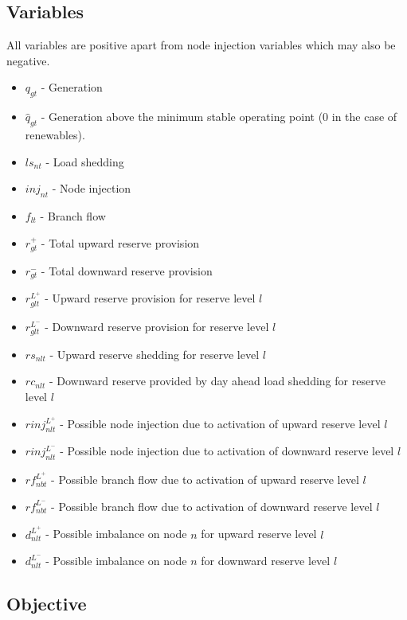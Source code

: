 \documentclass[number,times]{elsarticle}
\begin{document}
\subsection{Variables}

All variables are positive apart from node injection variables which may also be negative.

\begin{itemize}
    \item $q_{gt}$ - Generation
    \item $\hat{q}_{gt}$ - Generation above the minimum stable operating point (0 in the case of renewables).
    \item $ls_{nt}$ - Load shedding
    \item $inj_{nt}$ - Node injection
    \item $f_{lt}$ - Branch flow
    \item $r^+_{gt}$ - Total upward reserve provision
    \item $r^-_{gt}$ - Total downward reserve provision
    \item $r^{L^+}_{glt}$ - Upward reserve provision for reserve level $l$
    \item $r^{L^-}_{glt}$ - Downward reserve provision for reserve level $l$
    \item $rs_{nlt}$ - Upward reserve shedding for reserve level $l$
    \item $rc_{nlt}$ - Downward reserve provided by day ahead load shedding for reserve level $l$
    \item $rinj_{nlt}^{L^+}$ - Possible node injection due to activation of upward reserve level $l$
    \item $rinj_{nlt}^{L^-}$ - Possible node injection due to activation of downward reserve level $l$
    \item $rf_{nbt}^{L^+}$ - Possible branch flow due to activation of upward reserve level $l$
    \item $rf_{nbt}^{L^-}$ - Possible branch flow due to activation of downward reserve level $l$
    \item $d_{nlt}^{L^+}$ - Possible imbalance on node $n$ for upward reserve level $l$
    \item $d_{nlt}^{L^-}$ - Possible imbalance on node $n$ for downward reserve level $l$
\end{itemize}

\subsection{Objective}
\end{document}
